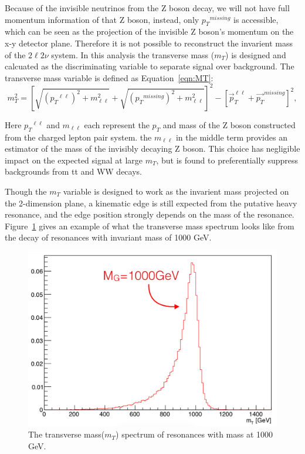 \vspace{0.3cm}
Because of the invisible neutrinos from the Z boson decay, we will not have full momentum information of that Z boson, instead, only ${p_{T}}^{missing}$ is accessible, which can be seen as the projection of the invisible Z boson's momentum on the x-y detector plane. Therefore it is not possible to reconstruct the invarient mass of the $2\ell 2\nu$ system. In this analysis the transverse mass ($m_{T}$) is designed and calcuated as the discriminating variable to separate signal over background. The transverse mass variable is defined as Equation~\ref{eqn:MT}:
\begin{equation}
m_{T}^2 = \left[ \sqrt{({p_{T}}^{\ell\ell})^2 + m^2_{\ell\ell}}
      + \sqrt{({p_{T}}^{missing})^2+m^2_{\ell\ell}}\right]^2
      - \left[\vec{p}_{T}^{\ell\ell}+\vec{p_{T}}^{missing}\right]^2,
\label{eqn:MT}
\end{equation}

Here ${p_{T}}^{\ell\ell}$ and $m_{\ell\ell}$ each represent the $p_{T}$ and mass of the Z boson constructed from the charged lepton pair system. the $m_{\ell\ell}$ in the middle term provides an estimator of the mass of the invisibly decaying Z boson. This choice has negligible impact on the expected signal at large $m_{T}$, but is found to preferentially suppress backgrounds from tt and WW decays.

\vspace{0.3cm}
Though the $m_{T}$ variable is designed to work as the invarient mass projected on the 2-dimension plane, a kinematic edge is still expected from the putative heavy resonance, and the edge position strongly depends on the mass of the resonance. Figure~\ref{fig:intro_mt} gives an example of what the transverse mass spectrum looks like from the decay of resonances with invariant mass of 1000 GeV.

\begin{figure}[htbp]
\begin{center}
\includegraphics[width=0.72\linewidth]{figures/intro_example_mt.png}
\caption{The transverse mass($m_{T}$) spectrum of resonances with mass at 1000 GeV.}
\label{fig:intro_mt}
\end{center}
\end{figure}


